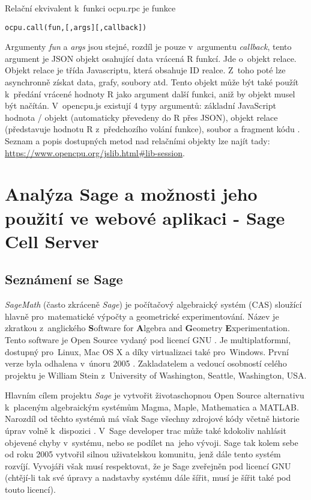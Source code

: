 \documentclass[thesis=B,czech]{FITthesis}[2012/06/26]
\begin{document}
Relační ekvivalent k~funkci ocpu.rpc je funkce 
\begin{alltt}
ocpu.call(fun, [,args] [,callback])
\end{alltt}
Argumenty \textit{fun} a \textit{args} jsou stejné, rozdíl je pouze v~argumentu \textit{callback}, tento argument je JSON objekt osahující data vrácená R funkcí. Jde o~objekt relace. Objekt relace je třída Javascriptu, která obsahuje ID realce. Z~toho poté lze asynchronně získat data, grafy, soubory atd. Tento objekt může být také použít k~předání vrácené hodnoty R jako argument další funkci, aniž by objekt musel být načítán. V~opencpu.js existují 4 typy argumentů: základní JavaScript hodnota / objekt (automaticky převedeny do R přes JSON), objekt relace (představuje hodnotu R z~předchozího volání funkce), soubor a fragment kódu \cite{OpenCPUjsLibrary}. Seznam a popis dostupných metod nad relačními objekty lze najít tady: \url{https://www.opencpu.org/jslib.html#lib-session}. 

\chapter[Analýza: Sage]{Analýza Sage a možnosti jeho použití ve webové aplikaci - Sage Cell Server}
\section{Seznámení se Sage}

\textit{SageMath} (často zkráceně \textit{Sage}) je počítačový algebraický systém (CAS) sloužící hlavně pro~matematické výpočty a geometrické experimentování. Název je zkratkou z~anglického \textbf{S}oftware for \textbf{A}lgebra and \textbf{G}eometry \textbf{E}xperimentation. Tento software je Open Source vydaný pod licencí GNU \cite{SageIntro}. Je multiplatformní, dostupný pro~Linux, Mac OS X a díky virtualizaci také pro~Windows. První verze byla odhalena v~únoru 2005 \cite{FoCM2011}. Zakladatelem a vedoucí osobností celého projektu je William Stein z~University of Washington, Seattle, Washington, USA.

Hlavním cílem projektu \textit{Sage} je vytvořit životaschopnou Open Source alternativu k~placeným algebraickým systémům Magma, Maple, Mathematica a MATLAB. Narozdíl od těchto systémů má však Sage všechny zdrojové kódy včetně historie úprav volně k~dispozici \cite{tracSage}. V~Sage developer trac může také kdokoliv nahlásit objevené chyby v~systému, nebo se podílet na~jeho vývoji. Sage tak kolem sebe od roku 2005 vytvořil silnou uživatelskou komunitu, jenž dále tento systém rozvíjí. Vyvojáři však musí respektovat, že je Sage zveřejněn pod licencí GNU (chtějí-li tak své úpravy a nadstavby systému dále šířit, musí je šířit také pod touto licencí).  
\end{document}
